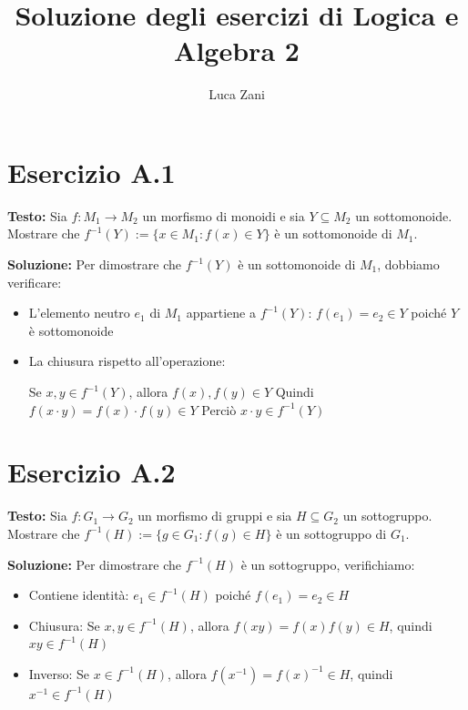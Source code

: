 \documentclass[a4paper,12pt]{article}
\title{Soluzione degli esercizi di Logica e Algebra 2}
\author{Luca Zani}
\newcommand{\esercizio}[2]{%
    \textbf{Testo:}
    #1
    
    \vspace{1.5em}
    
    \textbf{Soluzione:}
    #2
}
\begin{document}
\maketitle

\section*{Esercizio A.1}
\esercizio{%
    Sia $f : M_1 \to M_2$ un morfismo di monoidi e sia $Y \subseteq M_2$ un sottomonoide. Mostrare che $f^{-1}(Y) := \{x \in M_1 : f(x) \in Y\}$ è un sottomonoide di $M_1$.
}{%
    Per dimostrare che $f^{-1}(Y)$ è un sottomonoide di $M_1$, dobbiamo verificare:
    \begin{itemize}
        \item L'elemento neutro $e_1$ di $M_1$ appartiene a $f^{-1}(Y)$: $f(e_1) = e_2 \in Y$ poiché $Y$ è sottomonoide
        \item La chiusura rispetto all'operazione:

              Se $x,y \in f^{-1}(Y)$, allora $f(x), f(y) \in Y$ Quindi $f(x \cdot y) = f(x) \cdot f(y) \in Y$ Perciò $x \cdot y \in f^{-1}(Y)$
    \end{itemize}
}

\section*{Esercizio A.2}
\esercizio{%
    Sia $f : G_1 \to G_2$ un morfismo di gruppi e sia $H \subseteq G_2$ un sottogruppo. Mostrare che $f^{-1}(H) := \{g \in G_1 : f(g) \in H\}$ è un sottogruppo di $G_1$.
}{%
    Per dimostrare che $f^{-1}(H)$ è un sottogruppo, verifichiamo:
    \begin{itemize}
        \item Contiene identità: $e_1 \in f^{-1}(H)$ poiché $f(e_1) = e_2 \in H$
        \item Chiusura: Se $x,y \in f^{-1}(H)$, allora $f(xy) = f(x)f(y) \in H$, quindi $xy \in f^{-1}(H)$
        \item Inverso: Se $x \in f^{-1}(H)$, allora $f(x^{-1}) = f(x)^{-1} \in H$, quindi $x^{-1} \in f^{-1}(H)$
    \end{itemize}
}
\end{document}
